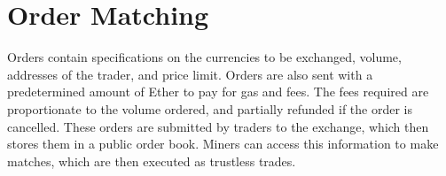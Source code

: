 \documentclass[a4paper]{article}
\begin{document}
        \begin{small}
        \begin{center}
        \end{center}
        \end{small}
\section*{Order Matching}
	Orders contain specifications on
    the currencies to be exchanged, volume, addresses of the trader,
    and price limit. Orders are also sent with
    a predetermined amount of Ether to pay for gas and fees.
		The fees required are proportionate to the volume ordered, and partially refunded if the order is cancelled. These orders
    are submitted by traders to the exchange, which then stores them in a
    public order book. Miners can access this information to make matches,
    which are then executed as trustless trades.
\end{document}

